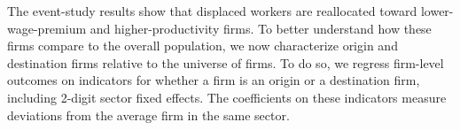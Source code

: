 
The event-study results show that displaced workers are reallocated toward lower-wage-premium and higher-productivity firms. To better understand how these firms compare to the overall population, we now characterize origin and destination firms relative to the universe of firms. To do so, we regress firm-level outcomes on indicators for whether a firm is an origin or a destination firm, including 2-digit sector fixed effects. The coefficients on these indicators measure deviations from the average firm in the same sector.

